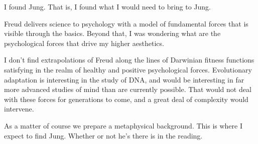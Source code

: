 

I found Jung.  That is, I found what I would need to bring to Jung.

Freud delivers science to psychology with a model of fundamental
forces that is visible through the basics.  Beyond that, I was
wondering what are the psychological forces that drive my higher
aesthetics.  

I don't find extrapolations of Freud along the lines of Darwinian
fitness functions satisfying in the realm of healthy and positive
psychological forces.  Evolutionary adaptation is interesting in the
study of DNA, and would be interesting in far more advanced studies of
mind than are currently possible.  That would not deal with these
forces for generations to come, and a great deal of complexity would
intervene.

As a matter of course we prepare a metaphysical background.  This is
where I expect to find Jung.  Whether or not he's there is in the
reading.

\bye

